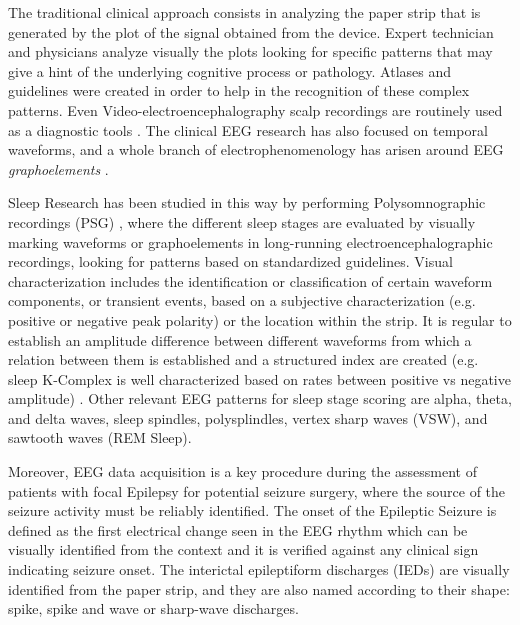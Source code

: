 The traditional clinical approach consists in analyzing the paper strip that is generated by the plot of the signal obtained from the device.  Expert technician and physicians analyze visually the plots looking for specific patterns that may give a hint of the underlying cognitive process or pathology.   Atlases and guidelines were created in order to help in the recognition of these complex patterns.   Even Video-electroencephalography scalp recordings are routinely used as a diagnostic tools \cite{Giagante2003} .  The clinical EEG research has also focused on temporal waveforms, and a whole branch of electrophenomenology has arisen around EEG \textit{graphoelements} \cite{Schomer2010}.  

Sleep Research has been studied in this way by performing Polysomnographic recordings (PSG)  \cite{Rodenbeck2006}, where the different sleep stages are evaluated by visually marking waveforms or graphoelements in long-running electroencephalographic recordings, looking for patterns based on standardized guidelines.   Visual characterization includes the identification or classification of certain waveform components, or transient events, based on a subjective characterization (e.g. positive or negative peak polarity) or the location within the strip.  It is regular to establish an amplitude difference between different waveforms from which a relation between them is established and a structured index are created (e.g. sleep K-Complex is well characterized based on rates between positive vs negative amplitude) \cite{Uchida1999}.  Other relevant EEG patterns for sleep stage scoring are alpha, theta, and delta waves,  sleep spindles, polysplindles, vertex sharp waves (VSW), and sawtooth waves (REM Sleep).

Moreover, EEG data acquisition is a key procedure during the assessment of patients with focal Epilepsy for potential seizure surgery, where the source of the seizure activity must be reliably identified. The onset of the Epileptic Seizure is defined as the first electrical change seen in the EEG rhythm which can be visually identified from the context and it is verified against any clinical sign indicating seizure onset.  The interictal epileptiform discharges (IEDs) are visually identified from the paper strip, and they are also named according to their shape: spike, spike and wave or sharp-wave discharges\cite{EEGIntro}.  

